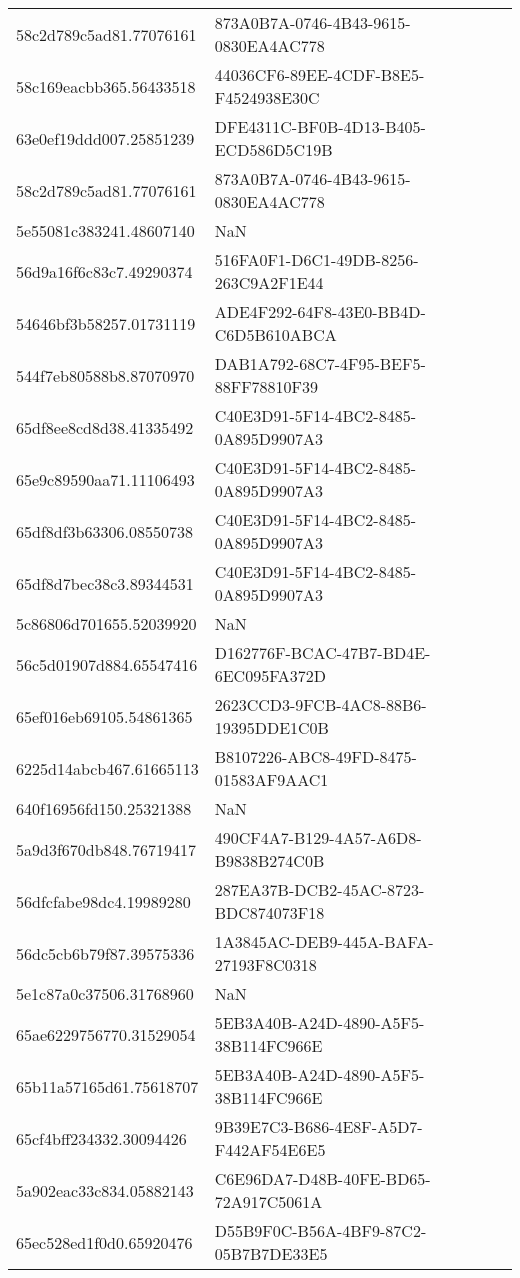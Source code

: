 \begin{tabular}{ll}
58c2d789c5ad81.77076161 & 873A0B7A-0746-4B43-9615-0830EA4AC778 \\
58c169eacbb365.56433518 & 44036CF6-89EE-4CDF-B8E5-F4524938E30C \\
63e0ef19ddd007.25851239 & DFE4311C-BF0B-4D13-B405-ECD586D5C19B \\
58c2d789c5ad81.77076161 & 873A0B7A-0746-4B43-9615-0830EA4AC778 \\
5e55081c383241.48607140 & NaN \\
56d9a16f6c83c7.49290374 & 516FA0F1-D6C1-49DB-8256-263C9A2F1E44 \\
54646bf3b58257.01731119 & ADE4F292-64F8-43E0-BB4D-C6D5B610ABCA \\
544f7eb80588b8.87070970 & DAB1A792-68C7-4F95-BEF5-88FF78810F39 \\
65df8ee8cd8d38.41335492 & C40E3D91-5F14-4BC2-8485-0A895D9907A3 \\
65e9c89590aa71.11106493 & C40E3D91-5F14-4BC2-8485-0A895D9907A3 \\
65df8df3b63306.08550738 & C40E3D91-5F14-4BC2-8485-0A895D9907A3 \\
65df8d7bec38c3.89344531 & C40E3D91-5F14-4BC2-8485-0A895D9907A3 \\
5c86806d701655.52039920 & NaN \\
56c5d01907d884.65547416 & D162776F-BCAC-47B7-BD4E-6EC095FA372D \\
65ef016eb69105.54861365 & 2623CCD3-9FCB-4AC8-88B6-19395DDE1C0B \\
6225d14abcb467.61665113 & B8107226-ABC8-49FD-8475-01583AF9AAC1 \\
640f16956fd150.25321388 & NaN \\
5a9d3f670db848.76719417 & 490CF4A7-B129-4A57-A6D8-B9838B274C0B \\
56dfcfabe98dc4.19989280 & 287EA37B-DCB2-45AC-8723-BDC874073F18 \\
56dc5cb6b79f87.39575336 & 1A3845AC-DEB9-445A-BAFA-27193F8C0318 \\
5e1c87a0c37506.31768960 & NaN \\
65ae6229756770.31529054 & 5EB3A40B-A24D-4890-A5F5-38B114FC966E \\
65b11a57165d61.75618707 & 5EB3A40B-A24D-4890-A5F5-38B114FC966E \\
65cf4bff234332.30094426 & 9B39E7C3-B686-4E8F-A5D7-F442AF54E6E5 \\
5a902eac33c834.05882143 & C6E96DA7-D48B-40FE-BD65-72A917C5061A \\
65ec528ed1f0d0.65920476 & D55B9F0C-B56A-4BF9-87C2-05B7B7DE33E5 \\

\end{tabular}
